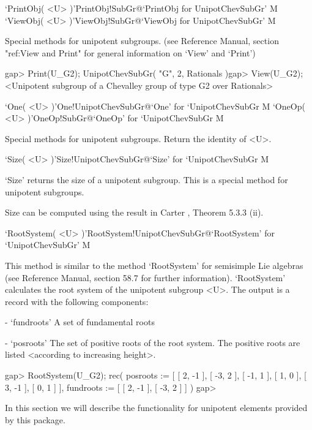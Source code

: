 \>`PrintObj( <U> )'{PrintObj!SubGr}@{`PrintObj for UnipotChevSubGr'} M
\>`ViewObj( <U> )'{ViewObj!SubGr}@{`ViewObj for UnipotChevSubGr'} M

Special methods for unipotent subgroups.
(see {\GAP} Reference Manual, section "ref:View and Print" for general 
information on `View' and `Print')

\beginexample
gap> Print(U_G2);
UnipotChevSubGr( "G", 2, Rationals )gap> View(U_G2);
<Unipotent subgroup of a Chevalley group of type G2 over Rationals>
\endexample

\>`One( <U> )'{One!UnipotChevSubGr}@{`One' for `UnipotChevSubGr} M
\>`OneOp( <U> )'{OneOp!SubGr}@{`OneOp' for `UnipotChevSubGr} M

Special methods for unipotent subgroups. Return the identity of <U>.

\>`Size( <U> )'{Size!UnipotChevSubGr}@{`Size' for `UnipotChevSubGr} M

`Size' returns the size of a unipotent subgroup. This is a
special method for unipotent subgroups.

Size can be computed using the result in Carter \cite{Carter72}, Theorem
5.3.3 (ii).

\>`RootSystem( <U> )'{RootSystem!UnipotChevSubGr}@{`RootSystem' for `UnipotChevSubGr'} M

This method is similar to the method `RootSystem' for semisimple Lie
algebras (see {} Reference Manual, section 58.7 for further
information). `RootSystem' calculates the root system of the unipotent
subgroup <U>. The output is a record with the following components:
\beginlist
\item{-} `fundroots'
  A set of fundamental roots
\item{-} `posroots'
  The set of positive roots of the root system.
  The positive roots are listed <according to increasing height>.
\endlist                                                                                                      

\beginexample
gap> RootSystem(U_G2);
rec( posroots := [ [ 2, -1 ], [ -3, 2 ], [ -1, 1 ], [ 1, 0 ], [ 3, -1 ], [ 0, 1 ] ], 
    fundroots := [ [ 2, -1 ], [ -3, 2 ] ] )
gap>
\endexample



In this section we will describe the functionality for unipotent elements
provided by this package.

